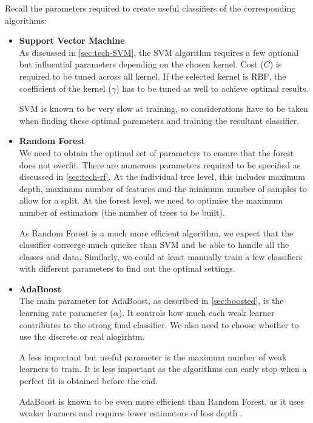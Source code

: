 Recall the parameters required to create useful classifiers of the corresponding algorithms:

\begin{itemize}
  \item \textbf{Support Vector Machine} \\
    As discussed in \autoref{sec:tech-SVM}, the SVM algorithm requires a few optional but influential parameters depending on the chosen kernel. Cost ($C$) is required to be tuned across all kernel. If the selected kernel is RBF, the coefficient of the kernel ($\gamma$) has to be tuned as well to achieve optimal results. 

    SVM is known to be very slow at training, so considerations have to be taken when finding these optimal parameters and training the resultant classifier.

  \item \textbf{Random Forest} \\
    We need to obtain the optimal set of parameters to ensure that the forest does not overfit. There are numerous parameters required to be specified as discussed in \autoref{sec:tech-rf}. At the individual tree level, this includes maximum depth, maximum number of features and the minimum number of samples to allow for a split. At the forest level, we need to optimise the maximum number of estimators (the number of trees to be built).

As Random Forest is a much more efficient algorithm, we expect that the classifier converge much quicker than SVM and be able to handle all the classes and data. Similarly, we could at least manually train a few classifiers with different parameters to find out the optimal settings. \\

  \item \textbf{AdaBoost} \\
    The main parameter for AdaBoost, as described in \autoref{sec:boosted}, is the learning rate parameter ($\alpha$). It controls how much each weak learner contributes to the strong final classifier. We also need to choose whether to use the discrete or real alogirhtm. 
    
    A less important but useful parameter is the maximum number of weak learners to train. It is less important as the algorithms can early stop when a perfect fit is obtained before the end.

    AdaBoost is known to be even more efficient than Random Forest, as it uses weaker learners and requires fewer estimators of less depth \cite{boosting}. 
\end{itemize}

